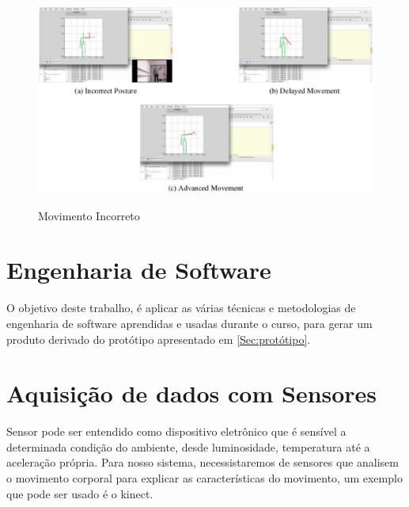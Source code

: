 \begin{figure}[!h]                                                             
\centering                                                                     
\includegraphics [keepaspectratio=true,scale=0.60]{figuras/movimentoIncorreto.eps}
                       
\caption{Movimento Incorreto}                                                     
\cite{roberto}                                                       
\label{movimentoIncorreto}                                                        
\end{figure}                                                                   



\section{Engenharia de Software}
\label{Sec:ContextoESW}
  O objetivo deste trabalho, é aplicar as várias técnicas e metodologias de engenharia de software  aprendidas e usadas durante o curso, para gerar um produto derivado do protótipo apresentado em \ref{Sec:protótipo}.
\section{Aquisição de dados com Sensores}
\label{Sec:Aquisição de dados com sensores}

  Sensor pode ser entendido como dispositivo eletrônico que é sensível a determinada
condição do ambiente, desde luminosidade, temperatura até a aceleração própria.
Para nosso sistema, necessistaremos de sensores que analisem o movimento corporal
para explicar as características do movimento, um exemplo que pode ser usado é o
kinect.

